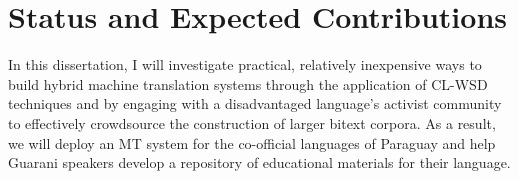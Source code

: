 \section{Status and Expected Contributions}
In this dissertation, I will investigate practical, relatively inexpensive ways
to build hybrid machine translation systems through the application of CL-WSD
techniques and by engaging with a disadvantaged language's activist community
to effectively crowdsource the construction of larger bitext corpora. As a
result, we will deploy an MT system for the co-official languages of Paraguay
and help Guarani speakers develop a repository of educational materials for
their language.

